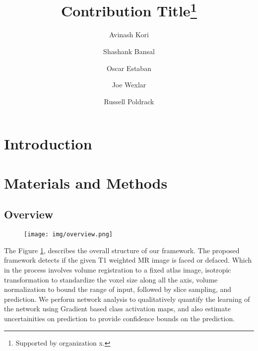 \documentclass[runningheads]{llncs}
\begin{document}
%
\title{Contribution Title\thanks{Supported by organization x.}}
%
%
\author{%
Avinash Kori\orcidID{} %
\and Shashank Bansal\orcidID{} %
\and Oscar Estaban \orcidID{}%
\and Joe Wexlar \orcidID{}%
\and Russell Poldrack\orcidID{}}
%
%
%
\maketitle              %
%
\begin{abstract}

\keywords{}
\end{abstract}
%
\section{Introduction}


\newpage
\section{Materials and Methods}

\subsection{Overview}
\begin{figure}
 \centering
 \label{fig:overview}
 \texttt{[image: img/overview.png]}
\end{figure}

The Figure \ref{fig:overview}, describes the overall structure of our framework. The proposed framework detects if the given T1 weighted MR image is faced or defaced. Which in the process involves volume registration to a fixed atlas image, isotropic transformation to standardize the voxel size along all the axis, volume normalization to bound the range of input, followed by slice sampling, and prediction. We perform network analysis to qualitatively quantify the learning of the network using Gradient based class activation maps, and also estimate uncertainities on prediction to provide confidence bounds on the prediction. 
\end{document}

